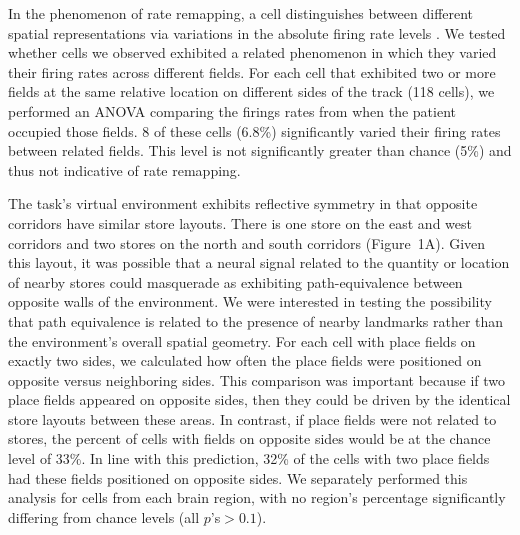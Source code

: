 In the phenomenon of rate remapping, a cell distinguishes between different spatial representations via variations in the absolute firing rate levels  \cite{QuirEtal92,LeutEtal05,SingEtal10,AlleEtal12}.  We tested whether cells we observed exhibited a related phenomenon in which they varied their firing rates across different fields.  For each cell that exhibited two or more fields at the same relative location on different sides of the track (118 cells), we performed an ANOVA comparing the firings rates from when the patient occupied those fields. 8 of these cells (6.8\%) significantly varied their firing rates between related fields. This level is not significantly greater than chance (5\%) and thus not indicative of rate remapping.

The task's virtual environment exhibits reflective symmetry in that opposite corridors have similar store layouts.  There is one store on the east and west corridors and two stores on the north and south corridors (Figure~1A).  Given this layout, it was possible that a neural signal related to the quantity or location of nearby stores could masquerade as exhibiting path-equivalence between opposite walls of the environment.  We were interested in testing the possibility that path equivalence is related to the presence of nearby landmarks rather than the environment's overall spatial geometry.  For each cell with place fields on exactly two sides, we calculated how often the place fields were positioned on opposite versus neighboring sides.  This comparison was important because if two place fields appeared on opposite sides, then they could be driven by the identical store layouts between these areas. In contrast, if place fields were not related to stores, the percent of cells with fields on opposite sides would be at the chance level of 33\%. In line with this prediction, 32\% of the cells with two place fields had these fields positioned on opposite sides. We separately performed this analysis for cells from each brain region, with no region's percentage significantly differing from chance levels (all $p$'s$ > 0.1$).


